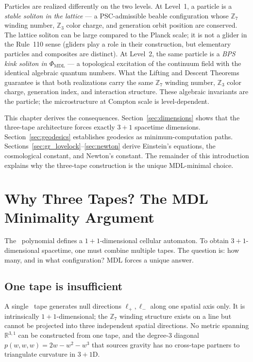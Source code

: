 \documentclass[11pt,openany]{book}
\theoremstyle{remark}
\newcommand{\PHIMDL}{\Phi_{\mathrm{MDL}}}
\newcommand{\CMCA}{\text{CMCA}}
\begin{document}
Particles are realized differently on the two levels.
At Level~1, a particle is a \emph{stable soliton in the lattice} --- a PSC-admissible
\CMCA{} beable configuration whose $\mathbb{Z}_7$ winding number, $\mathbb{Z}_3$ color
charge, and generation orbit position are conserved.
The lattice soliton can be large compared to the Planck scale; it is not a glider in the
Rule~110 sense (gliders play a role in their construction, but elementary particles and
composites are distinct).
At Level~2, the same particle is a \emph{BPS kink soliton in $\PHIMDL$} --- a topological
excitation of the continuum field with the identical algebraic quantum numbers.
What the Lifting and Descent Theorems guarantee is that both realizations carry the same
$\mathbb{Z}_7$ winding number, $\mathbb{Z}_3$ color charge, generation index, and
interaction structure.
These algebraic invariants are the particle; the microstructure at Compton scale is level-dependent.

This chapter derives the consequences.
Section~\ref{sec:dimensions} shows that the three-tape architecture forces exactly $3{+}1$
spacetime dimensions.
Section~\ref{sec:geodesics} establishes geodesics as minimum-computation paths.
Sections~\ref{sec:gr_lovelock}--\ref{sec:newton} derive Einstein's equations, the cosmological
constant, and Newton's constant.
The remainder of this introduction explains why the three-tape construction is the unique
MDL-minimal choice.

\section*{Why Three Tapes? The MDL Minimality Argument}
\label{sec:why_three_tapes}

The \CMCA\ polynomial defines a $1{+}1$-dimensional cellular automaton.
To obtain $3{+}1$-dimensional spacetime, one must combine multiple tapes.
The question is: how many, and in what configuration?
MDL forces a unique answer.

\subsection*{One tape is insufficient}

A single \CMCA\ tape generates null directions $\ell_+, \ell_-$ along one spatial axis only.
It is intrinsically $1{+}1$-dimensional; the $\mathbb{Z}_7$ winding structure exists on a
line but cannot be projected into three independent spatial directions.
No metric spanning $\mathbb{R}^{3,1}$ can be constructed from one tape, and the degree-3
diagonal $p(w,w,w) = 2w-w^2-w^3$ that sources gravity has no cross-tape partners
to triangulate curvature in $3{+}1$D.
\end{document}
